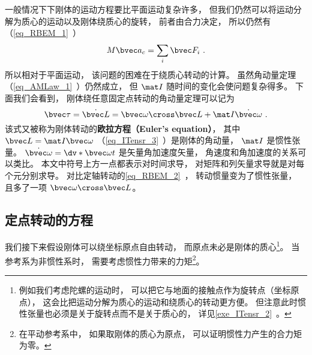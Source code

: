 

一般情况下下刚体的运动方程要比平面运动复杂许多， 但我们仍然可以将运动分解为质心的运动以及刚体绕质心的旋转， 前者由合力决定， 所以仍然有（\autoref{eq_RBEM_1}~）
\begin{equation}\label{eq_RBEqM_8}
M\bvec a_c = \sum_i \bvec F_i~.
\end{equation}
所以相对于平面运动， 该问题的困难在于绕质心转动的计算。 虽然角动量定理（\autoref{eq_AMLaw_1}~）仍然成立， 但 $\mat I$ 随时间的变化会使问题复杂得多。 下面我们会看到， 刚体绕任意固定点转动的角动量定理可以记为
\begin{equation}\label{eq_RBEqM_1}
\bvec\tau = \dot{\bvec L} = \bvec\omega \cross \bvec L + \mat I \dot{\bvec\omega}~.
\end{equation}
该式又被称为刚体转动的\textbf{欧拉方程（Euler's equation）}， 其中 $\bvec L = \mat I\bvec\omega$ （\autoref{eq_ITensr_3}~）是刚体的角动量， $\mat I$ 是惯性张量。 $\dot{\bvec\omega} = \dv*{\bvec\omega}{t}$ 是矢量角加速度矢量， 角速度和角加速度的关系可以类比。 本文中符号上方一点都表示对时间求导， 对矩阵和列矢量求导就是对每个元分别求导。  对比定轴转动的\autoref{eq_RBEM_2}~， 转动惯量变为了惯性张量， 且多了一项 $\bvec\omega \cross \bvec L$。

\subsection{定点转动的方程}
我们接下来假设刚体可以绕坐标原点自由转动， 而原点未必是刚体的质心\footnote{例如我们考虑陀螺的运动时， 可以把它与地面的接触点作为旋转点（坐标原点）， 这会比把运动分解为质心的运动和绕质心的转动更方便。 但注意此时惯性张量也必须是关于旋转点而不是关于质心的， 详见\autoref{exe_ITensr_2}~。}。 当参考系为非惯性系时， 需要考虑惯性力带来的力矩\footnote{在平动参考系中， 如果取刚体的质心为原点， 可以证明惯性力产生的合力矩为零。}。

